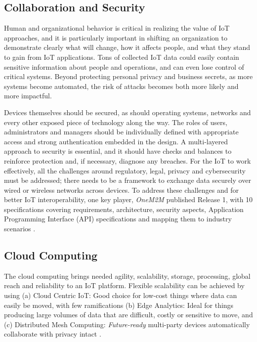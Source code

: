 \documentclass[sigconf]{acmart}
\begin{document}
		
	\subsection{Collaboration and Security}
	Human and organizational behavior is critical in realizing the value of IoT approaches, and it is particularly important in shifting an organization to demonstrate clearly what will change, how it affects people, and what they stand to gain from IoT applications. Tons of collected IoT data could easily contain sensitive information about people and operations, and can even lose control of critical systems. Beyond protecting personal privacy and business secrets, as more systems become automated, the risk of attacks becomes both more likely and more impactful. 
	
	Devices themselves should be secured, as should operating systems, networks and every other exposed piece of technology along the way. The roles of users, administrators and managers should be individually defined with appropriate access and strong authentication embedded in the design. A multi-layered approach to security is essential, and it should have checks and balances to reinforce protection and, if necessary, diagnose any breaches. For the IoT to work effectively, all the challenges around regulatory, legal, privacy and cybersecurity must be addressed; there needs to be a framework to exchange data securely over wired or wireless networks across devices. To address these challenges and for better IoT interoperability, one key player, {\em OneM2M} published Release 1, with 10 specifications covering requirements, architecture, security aspects, Application Programming Interface (API) specifications and mapping them to industry scenarios \cite{one-m2m}.
	
	\subsection{Cloud Computing}
	The cloud computing brings needed agility, scalability, storage, processing, global reach and reliability to an IoT platform. Flexible scalability can be achieved by using (a) Cloud Centric IoT: Good choice for low-cost things where data can easily be moved, with few ramifications (b) Edge Analytics: Ideal for things producing large volumes of data that are difficult, costly or sensitive to move, and (c) Distributed Mesh Computing: {\em Future-ready} multi-party devices automatically collaborate with privacy intact \cite{hp}. 
	
\end{document}
